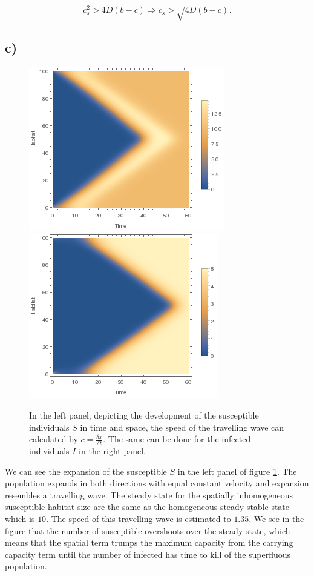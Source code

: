 $$
 c^2_s>4D(b-c)\Rightarrow c_s > \sqrt{4D(b-c)}.
 $$
 
\subsection*{c)}

\begin{figure}
\centering
\includegraphics[scale=0.5]{img/listdensityplot_S.png}
\includegraphics[scale=0.5]{img/listdensityplot_P.png}
\caption{\label{fig:pic1c} In the left panel, depicting the development of the susceptible individuals $S$ in time and space, the speed of the travelling wave can calculated by $c=\frac{\delta x}{\delta t}$. The same can be done for the infected individuals $I$ in the right panel.}
\end{figure}

We can see the expansion of the susceptible $S$ in the left panel of figure \ref{fig:pic1c}. The population expands in both directions with equal constant velocity and expansion resembles a travelling wave. The steady state for the spatially inhomogeneous susceptible habitat size are the same as the homogeneous steady stable state which is $10$. The speed of this travelling wave is estimated to $1.35$. We see in the figure that the number of susceptible overshoots over the steady state, which means that the spatial term trumps the maximum capacity from the carrying capacity term until the number of infected has time to kill of the superfluous population. \\

